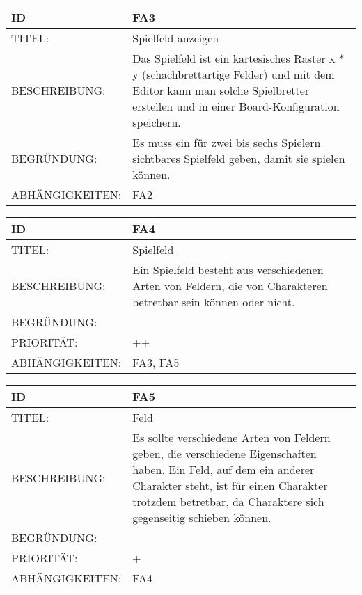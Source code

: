 \documentclass{uulm-assignment}
\begin{document}
    \begin{tabularx}{\textwidth}{|l|X |} \hline
        \textbf{ID} & \textbf{FA3} \\
        \hline
        TITEL: & Spielfeld anzeigen \\
        \hline
        BESCHREIBUNG: & Das Spielfeld ist ein kartesisches Raster x * y (schachbrettartige Felder) und mit dem Editor kann man solche Spielbretter erstellen und in einer Board-Konfiguration speichern. 
        \\
        \hline
        BEGRÜNDUNG: & Es muss ein für zwei bis sechs Spielern sichtbares Spielfeld geben, damit sie spielen können.\\
        \hline
        ABHÄNGIGKEITEN: & FA2\\
        \hline
    \end{tabularx}

    \begin{tabularx}{\textwidth}{|l|X |} \hline
        \textbf{ID} & \textbf{FA4} \\
        \hline
        TITEL: & Spielfeld \\
        \hline
        BESCHREIBUNG: & Ein Spielfeld besteht aus verschiedenen Arten von Feldern, die von Charakteren betretbar sein können oder nicht. 
        \\
        \hline
        BEGRÜNDUNG: & \\
        \hline
        PRIORITÄT: & ++\\
        \hline
        ABHÄNGIGKEITEN: & FA3, FA5\\
        \hline
    \end{tabularx}

    \begin{tabularx}{\textwidth}{|l|X |} \hline
        \textbf{ID} & \textbf{FA5} \\
        \hline
        TITEL: &  Feld\\
        \hline
        BESCHREIBUNG: & Es sollte verschiedene Arten von Feldern geben, die verschiedene Eigenschaften haben. Ein Feld, auf dem ein anderer Charakter steht, ist für einen Charakter trotzdem betretbar, da Charaktere sich gegenseitig schieben können. 
        \\
        \hline
        BEGRÜNDUNG: & \\
        \hline
        PRIORITÄT: & +\\
        \hline
        ABHÄNGIGKEITEN: & FA4\\
        \hline
    \end{tabularx}
    
\end{document}
